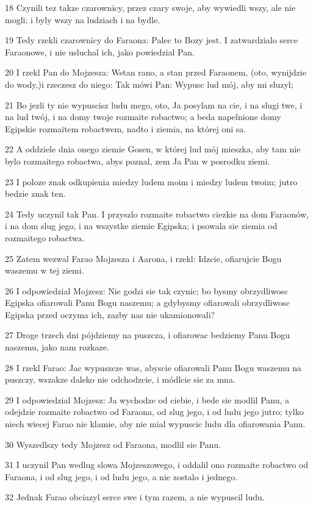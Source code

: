 \par 18 Czynili tez takze czarownicy, przez czary swoje, aby wywiedli wszy, ale nie mogli; i byly wszy na ludziach i na bydle.
\par 19 Tedy rzekli czarownicy do Faraona: Palec to Bozy jest. I zatwardzialo serce Faraonowe, i nie usluchal ich, jako powiedzial Pan.
\par 20 I rzekl Pan do Mojzesza: Wstan rano, a stan przed Faraonem, (oto, wynijdzie do wody,)i rzeczesz do niego: Tak mówi Pan: Wypusc lud mój, aby mi sluzyl;
\par 21 Bo jezli ty nie wypuscisz ludu mego, oto, Ja posylam na cie, i na slugi twe, i na lud twój, i na domy twoje rozmaite robactwo; a beda napelnione domy Egipskie rozmaitem robactwem, nadto i ziemia, na której oni sa.
\par 22 A oddziele dnia onego ziemie Gosen, w której lud mój mieszka, aby tam nie bylo rozmaitego robactwa, abys poznal, zem Ja Pan w posrodku ziemi.
\par 23 I poloze znak odkupienia miedzy ludem moim i miedzy ludem twoim; jutro bedzie znak ten.
\par 24 Tedy uczynil tak Pan. I przyszlo rozmaite robactwo ciezkie na dom Faraonów, i na dom slug jego, i na wszystke ziemie Egipska; i psowala sie ziemia od rozmaitego robactwa.
\par 25 Zatem wezwal Farao Mojzesza i Aarona, i rzekl: Idzcie, ofiarujcie Bogu waszemu w tej ziemi.
\par 26 I odpowiedzial Mojzesz: Nie godzi sie tak czynic; bo bysmy obrzydliwosc Egipska ofiarowali Panu Bogu naszemu; a gdybysmy ofiarowali obrzydliwosc Egipska przed oczyma ich, zazby nas nie ukamionowali?
\par 27 Droge trzech dni pójdziemy na puszcza, i ofiarowac bedziemy Panu Bogu naszemu, jako nam rozkaze.
\par 28 I rzekl Farao: Jac wypuszcze was, abyscie ofiarowali Panu Bogu waszemu na puszczy, wszakze daleko nie odchodzcie, i módlcie sie za mna.
\par 29 I odpowiedzial Mojzesz: Ja wychodze od ciebie, i bede sie modlil Panu, a odejdzie rozmaite robactwo od Faraona, od slug jego, i od ludu jego jutro; tylko niech wiecej Farao nie klamie, aby nie mial wypuscic ludu dla ofiarowania Panu.
\par 30 Wyszedlszy tedy Mojzesz od Faraona, modlil sie Panu.
\par 31 I uczynil Pan wedlug slowa Mojzeszowego, i oddalil ono rozmaite robactwo od Faraona, i od slug jego, i od ludu jego, a nie zostalo i jednego.
\par 32 Jednak Farao obciazyl serce swe i tym razem, a nie wypuscil ludu.

